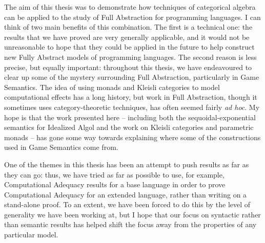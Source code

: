 The aim of this thesis was to demonstrate how techniques of categorical algebra can be applied to the study of Full Abstraction for programming languages.
I can think of two main benefits of this combination.
The first is a technical one: the results that we have proved are very generally applicable, and it would not be unreasonable to hope that they could be applied in the future to help construct new Fully Abstract models of programming languages.  
The second reason is less precise, but equally important: throughout this thesis, we have endeavoured to clear up some of the mystery surrounding Full Abstraction, particularly in Game Semantics.  
The idea of using monads and Kleisli categories to model computational effects has a long history, but work in Full Abstraction, though it sometimes uses category-theoretic techniques, has often seemed fairly \emph{ad hoc}.  
My hope is that the work presented here -- including both the sequoidal-exponential semantics for Idealized Algol and the work on Kleisli categories and parametric monads -- has gone some way towards explaining where some of the constructions used in Game Semantics come from.

One of the themes in this thesis has been an attempt to push results as far as they can go: thus, we have tried as far as possible to use, for example, Computational Adequacy results for a base language in order to prove Computational Adequacy for an extended language, rather than writing on a stand-alone proof.
To an extent, we have been forced to do this by the level of generality we have been working at, but I hope that our focus on syntactic rather than semantic results has helped shift the focus away from the properties of any particular model.

